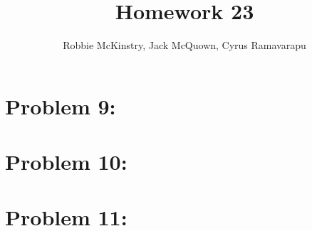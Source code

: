 \documentclass[12pt]{article}
\begin{document}
\title{Homework 23}
\author{Robbie McKinstry, Jack McQuown, Cyrus Ramavarapu}
\renewcommand{\today}{25 October 2016}
\renewcommand{\baselinestretch}{1.5}
\maketitle

\section*{Problem 9: }
\section*{Problem 10: }
\section*{Problem 11: }
\end{document}
